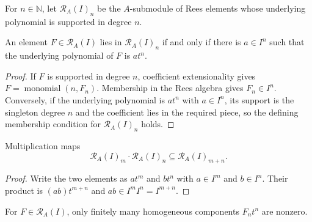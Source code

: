 \begin{definition}
  \label{def:nagata-rees-piece}

  For $n\in\mathbb N$, let $\mathcal R_A(I)_n$ be the $A$-submodule of Rees
  elements whose underlying polynomial is supported in degree $n$.
\end{definition}

\begin{lemma}
  \label{lemma:nagata-rees-piece-membership}

  An element $F\in\mathcal R_A(I)$ lies in $\mathcal R_A(I)_n$ if and only if
  there is $a\in I^n$ such that the underlying polynomial of $F$ is
  $at^n$.
\end{lemma}

\begin{proof}
  If $F$ is supported in degree $n$, coefficient extensionality gives
  $F=\operatorname{monomial}(n,F_n)$.  Membership in the Rees algebra gives
  $F_n\in I^n$.  Conversely, if the underlying polynomial is $at^n$ with $a\in I^n$, its
  support is the singleton degree $n$ and the coefficient lies in the required
  piece, so the defining membership condition for
  $\mathcal R_A(I)_n$ holds.
\end{proof}

\begin{lemma}
  \label{lemma:nagata-rees-piece-mul}

  Multiplication maps
  \[
    \mathcal R_A(I)_m\cdot\mathcal R_A(I)_n
      \subseteq\mathcal R_A(I)_{m+n}.
  \]
\end{lemma}

\begin{proof}
  Write the two elements as $at^m$ and $bt^n$ with $a\in I^m$ and
  $b\in I^n$.  Their product is $(ab)t^{m+n}$ and
  $ab\in I^mI^n=I^{m+n}$.
\end{proof}

\begin{lemma}
  \label{lemma:nagata-rees-component-finite-support}

  For $F\in\mathcal R_A(I)$, only finitely many homogeneous components
  $F_nt^n$ are nonzero.
\end{lemma}

